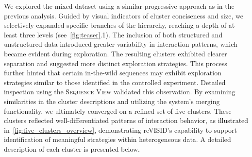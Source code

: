\documentclass[preprint,journal]{vgtc}            %
\begin{document}
We explored the mixed dataset using a similar progressive approach as in the previous analysis.
Guided by visual indicators of cluster conciseness and size, we selectively expanded specific branches of the hierarchy, reaching a depth of at least three levels (see~\cref{fig:teaser}.1). 
The inclusion of both structured and unstructured data introduced greater variability in interaction patterns, which became evident during exploration. 
The resulting clusters exhibited clearer separation and suggested more distinct exploration strategies.
This process further hinted that certain in-the-wild sequences may exhibit exploration strategies similar to those identified in the controlled experiment. 
Detailed inspection using the \textsc{Sequence View} validated this observation.
By examining similarities in the cluster descriptions and utilizing the system’s merging functionality, we ultimately converged on a refined set of five clusters.
These clusters reflected well-differentiated patterns of interaction behavior, as illustrated in~\cref{fig:five_clusters_overview}, demonstrating reVISID’s capability to support identification of meaningful strategies within heterogeneous data.
A detailed description of each cluster is presented below.
\end{document}
